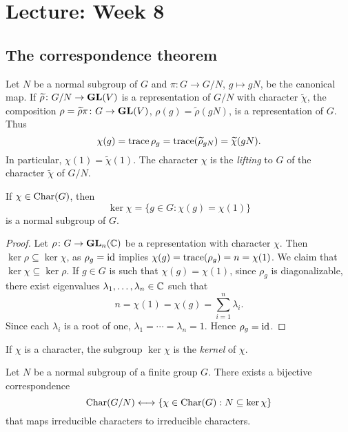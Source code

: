 \section{Lecture: Week 8}

\subsection{The correspondence theorem}

Let $N$ be a normal subgroup of $G$ 
and $\pi\colon G\to G/N$, $g\mapsto gN$, be the canonical map. 
If $\widetilde{\rho}\colon G/N\to\mathbf{GL}(V)$ 
is a representation of $G/N$ with 
character
$\widetilde{\chi}$, the composition 
$\rho=\widetilde{\rho}\pi\colon G\to \mathbf{GL}(V)$, $\rho(g)=\widetilde{\rho}(gN)$, 
is a representation of $G$. 
Thus
\[
\chi(g)=\operatorname{trace}{\rho_g}=\operatorname{trace}(\widetilde{\rho}_{gN})=\widetilde{\chi}(gN).
\]
In particular, $\chi(1)=\widetilde{\chi}(1)$. The character $\chi$ 
is the \emph{lifting} to $G$ of the character 
$\widetilde{\chi}$ of $G/N$. 

\begin{proposition}
If $\chi\in\operatorname{Char}(G)$, then 
\[
\ker\chi=\{g\in G:\chi(g)=\chi(1)\}
\]
is a normal subgroup of $G$. 
\end{proposition}

\begin{proof}
Let $\rho\colon G\to\mathbf{GL}_n(\mathbb{C})$ be a representation with character $\chi$. Then 
$\ker\rho\subseteq\ker\chi$, as $\rho_g=\operatorname{id}$ implies 
$\chi(g)=\operatorname{trace}(\rho_g)=n=\chi(1)$. We claim that  
$\ker\chi\subseteq\ker\rho$. If $g\in G$ is such that $\chi(g)=\chi(1)$, since 
$\rho_g$ is diagonalizable, there exist eigenvalues $\lambda_1,\dots,\lambda_n\in\mathbb{C}$ such that
\[
n=\chi(1)=\chi(g)=\sum_{i=1}^n\lambda_i.
\]
Since each $\lambda_i$ is a root of one,  
$\lambda_1=\cdots=\lambda_n=1$. Hence $\rho_g=\operatorname{id}$. 
\end{proof}

If $\chi$ is a character, the subgroup $\ker\chi$ 
is the \emph{kernel} of $\chi$. 

\begin{theorem}
Let $N$ be a normal subgroup of a finite group $G$. There exists
a bijective correspondence 
\[
\operatorname{Char}(G/N) \longleftrightarrow \{\chi\in\operatorname{Char}(G): 
N\subseteq\ker\chi\}
\]
that maps irreducible characters to irreducible characters.
\end{theorem}

